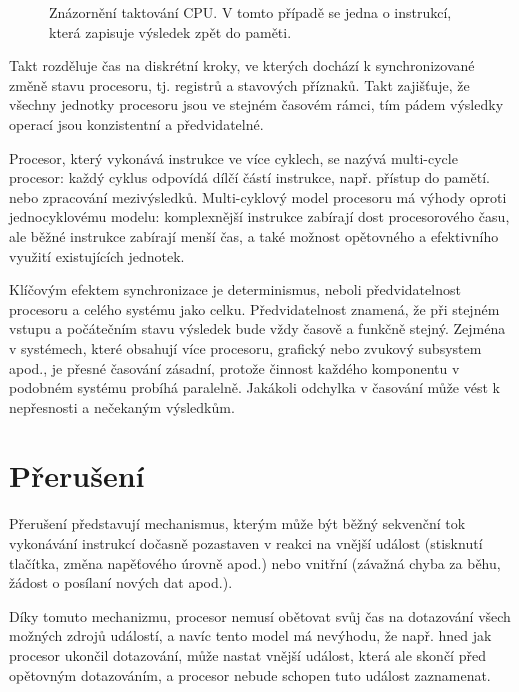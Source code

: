 \begin{figure}[htbp]
    \centering
    
    \caption{Znázornění taktování CPU. V tomto případě se jedna o instrukcí, která zapisuje výsledek
    zpět do paměti.}
    \label{fig:cpu_clock}
\end{figure}

Takt rozděluje čas na diskrétní kroky, ve kterých dochází k synchronizované změně stavu procesoru,
tj. registrů a stavových příznaků. Takt zajišťuje, že všechny jednotky procesoru jsou ve stejném
časovém rámci, tím pádem výsledky operací jsou konzistentní a předvidatelné.

Procesor, který vykonává instrukce ve více cyklech, se nazývá multi-cycle procesor: každý cyklus
odpovídá dílčí částí instrukce, např. přístup do pamětí. nebo zpracování mezivýsledků. Multi-cyklový
model procesoru má výhody oproti jednocyklovému modelu: komplexnější instrukce zabírají dost
procesorového času, ale běžné instrukce zabírají menší čas, a také možnost opětovného a efektivního
využití existujících jednotek.

Klíčovým efektem synchronizace je determinismus, neboli předvidatelnost procesoru a celého systému
jako celku. Předvidatelnost znamená, že při stejném vstupu a počátečním stavu výsledek bude vždy
časově a funkčně stejný. Zejména v systémech, které obsahují více procesoru, grafický nebo zvukový
subsystem apod., je přesné časování zásadní, protože činnost každého komponentu v podobném systému
probíhá paralelně. Jakákoli odchylka v časování může vést k nepřesnosti a nečekaným výsledkům.

\section{Přerušení}

%     

Přerušení představují mechanismus, kterým může být běžný sekvenční tok vykonávání instrukcí dočasně
pozastaven v reakci na vnější událost (stisknutí tlačítka, změna napěťového úrovně apod.) nebo
vnitřní (závažná chyba za běhu, žádost o posílaní nových dat apod.).

Díky tomuto mechanizmu, procesor nemusí obětovat svůj čas na dotazování všech možných zdrojů
událostí, a navíc tento model má nevýhodu, že např. hned jak procesor ukončil dotazování, může
nastat vnější událost, která ale skončí před opětovným dotazováním, a procesor nebude schopen tuto
událost zaznamenat.

